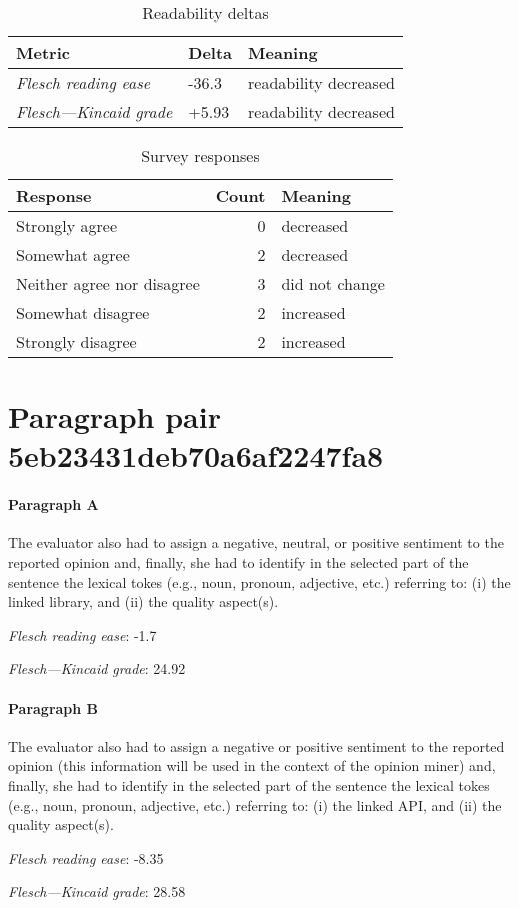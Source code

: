 \bigskip\begin{table}[!h]
\centering
\begin{tabular}{lll}
\toprule
               \textbf{Metric} & \textbf{Delta} &       \textbf{Meaning} \\
\midrule
    \emph{Flesch reading ease} &          -36.3 &  readability decreased \\
 \emph{Flesch---Kincaid grade} &          +5.93 &  readability decreased \\
\bottomrule
\end{tabular}
\caption*{Readability deltas}\end{table}

\begin{table}[!h]
\centering
\begin{tabular}{lrl}
\toprule
          \textbf{Response} &  \textbf{Count} & \textbf{Meaning} \\
\midrule
             Strongly agree &               0 &        decreased \\
             Somewhat agree &               2 &        decreased \\
 Neither agree nor disagree &               3 &   did not change \\
          Somewhat disagree &               2 &        increased \\
          Strongly disagree &               2 &        increased \\
\bottomrule
\end{tabular}
\caption*{Survey responses}\end{table}


\newpage
\section{Paragraph pair 5eb23431deb70a6af2247fa8}
\paragraph{Paragraph A}
The evaluator also had to assign a negative, neutral, or positive sentiment to the reported opinion and, finally, she had to identify in the selected part of the sentence the lexical tokes (e.g., noun, pronoun, adjective, etc.) referring to: (i) the linked library, and (ii) the quality aspect(s).\par\medskip
\emph{Flesch reading ease}: -1.7\par
\emph{Flesch---Kincaid grade}: 24.92

\paragraph{Paragraph B}
The evaluator also had to assign a negative or positive sentiment to the reported opinion (this information will be used in the context of the opinion miner) and, finally, she had to identify in the selected part of the sentence the lexical tokes (e.g., noun, pronoun, adjective, etc.) referring to: (i) the linked API, and (ii) the quality aspect(s).\par\medskip
\emph{Flesch reading ease}: -8.35\par
\emph{Flesch---Kincaid grade}: 28.58

